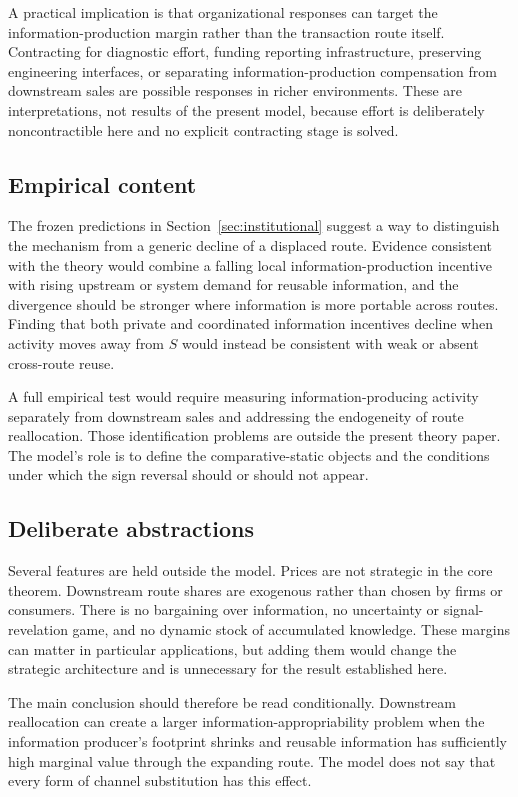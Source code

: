 A practical implication is that organizational responses can target the information-production margin rather than the transaction route itself. Contracting for diagnostic effort, funding reporting infrastructure, preserving engineering interfaces, or separating information-production compensation from downstream sales are possible responses in richer environments. These are interpretations, not results of the present model, because effort is deliberately noncontractible here and no explicit contracting stage is solved.

\subsection{Empirical content}

The frozen predictions in Section~\ref{sec:institutional} suggest a way to distinguish the mechanism from a generic decline of a displaced route. Evidence consistent with the theory would combine a falling local information-production incentive with rising upstream or system demand for reusable information, and the divergence should be stronger where information is more portable across routes. Finding that both private and coordinated information incentives decline when activity moves away from $S$ would instead be consistent with weak or absent cross-route reuse.

A full empirical test would require measuring information-producing activity separately from downstream sales and addressing the endogeneity of route reallocation. Those identification problems are outside the present theory paper. The model's role is to define the comparative-static objects and the conditions under which the sign reversal should or should not appear.

\subsection{Deliberate abstractions}

Several features are held outside the model. Prices are not strategic in the core theorem. Downstream route shares are exogenous rather than chosen by firms or consumers. There is no bargaining over information, no uncertainty or signal-revelation game, and no dynamic stock of accumulated knowledge. These margins can matter in particular applications, but adding them would change the strategic architecture and is unnecessary for the result established here.

The main conclusion should therefore be read conditionally. Downstream reallocation can create a larger information-appropriability problem when the information producer's footprint shrinks and reusable information has sufficiently high marginal value through the expanding route. The model does not say that every form of channel substitution has this effect.
